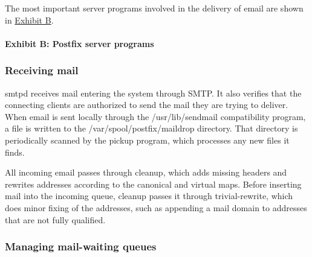 The most important server programs involved in the delivery of email are
shown in
\protect\hyperlink{part0026_split_058.htmlux5cux23_idTextAnchor1166}{Exhibit
B}.

\paragraph[{Exhibit B: }Postfix server
programs]{\texorpdfstring{{Exhibit B:
}\protect\hypertarget{part0026_split_058.htmlux5cux23_idIndexMarker2683}{}{}\protect\hypertarget{part0026_split_058.htmlux5cux23_idTextAnchor1166}{}{}Postfix
server programs}{Exhibit B: Postfix server programs}}


\subsubsection[Receiving
mail]{\texorpdfstring{\protect\hypertarget{part0026_split_058.htmlux5cux23_idTextAnchor1167}{}{}Receiving
mail}{Receiving mail}}

\protect\hypertarget{part0026_split_058.htmlux5cux23_idIndexMarker2684}{}{}\protect\hypertarget{part0026_split_058.htmlux5cux23_idIndexMarker2685}{}{}{smtpd}
receives mail entering the system through SMTP. It also verifies that
the connecting clients are authorized to send the mail they are trying
to deliver. When email is sent locally through the {/usr/lib/sendmail}
compatibility program, a file is written to the
\protect\hypertarget{part0026_split_058.htmlux5cux23_idIndexMarker2686}{}{}{/var/spool/postfix/maildrop}
directory. That directory is periodically scanned by the
\protect\hypertarget{part0026_split_058.htmlux5cux23_idIndexMarker2687}{}{}{pickup}
program, which processes any new files it finds.

All incoming email passes through
\protect\hypertarget{part0026_split_058.htmlux5cux23_idIndexMarker2688}{}{}{cleanup},
which adds missing headers and rewrites addresses according to the
{canonical} and {virtual} maps. Before inserting mail into the
{incoming} queue, {cleanup} passes it through {trivial-rewrite}, which
does minor fixing of the addresses, such as appending a mail domain to
addresses that are not fully qualified.

\subsubsection[Managing mail-waiting
queues]{\texorpdfstring{\protect\hypertarget{part0026_split_058.htmlux5cux23_idTextAnchor1168}{}{}Managing
mail-waiting queues}{Managing mail-waiting queues}}

